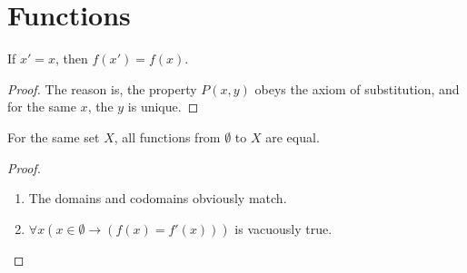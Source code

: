 \section{Functions}
\begin{why}{42}
	If $x'=x$, then $f(x')=f(x)$.
\end{why}
\begin{proof}
	The reason is, the property $P(x,y)$ obeys the axiom of substitution, and for the same $x$, the $y$ is unique.
\end{proof}

\begin{why}{43}
	For the same set $X$, all functions from $\emptyset$ to $X$ are equal.
\end{why}
\begin{proof}\leavevmode
	\begin{enumerate}
		\item The domains and codomains obviously match.
		\item $\forall x(x \in \emptyset \to (f(x) = f'(x)))$ is vacuously true.
	\end{enumerate}
\end{proof}

